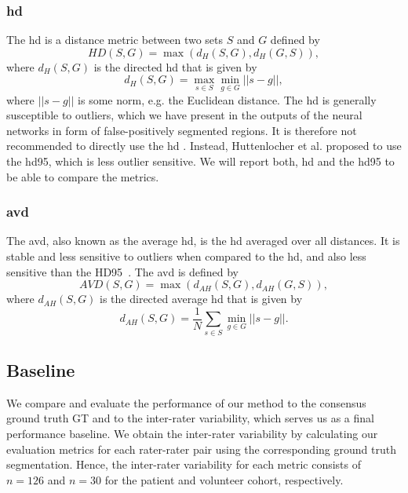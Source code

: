 \subsubsection{\glsdesc{hd}}
The \gls{hd} is a distance metric between two sets $S$ and $G$ defined by
\begin{equation}
   HD(S, G) = \max(d_{H}(S,G),d_{H}(G,S)),
   \label{eq:hd}
\end{equation}
where $d_{H}(S,G)$ is the directed \gls{hd} that is given by
\begin{equation}
   d_{H}(S, G) = \max\limits_{s \in S} \min\limits_{g \in G} ||s-g||,
   \label{eq:dhd}
\end{equation}
where $||s-g||$ is some norm, e.g. the Euclidean distance. The \acrlong{hd} is generally susceptible to outliers, which we have present in the outputs of the neural networks in form of false-positively segmented regions. It is therefore not recommended to directly use the \acrlong{hd} \cite{Taha2015MetricsTool}. Instead, Huttenlocher et al. \cite{Huttenlocher1993ComparingDistance} proposed to use the \gls{hd95}, which is less outlier sensitive. We will report both, \acrlong{hd} and the \acrlong{hd95} to be able to compare the metrics.

\subsubsection{\glsdesc{avd}}
The \gls{avd}, also known as the average \acrlong{hd}, is the \acrlong{hd} averaged over all distances. It is stable and less sensitive to outliers when compared to the \acrlong{hd}, and also less sensitive than the HD95~\cite{Taha2015MetricsTool}. The \acrlong{avd} is defined by
\begin{equation}
   AVD(S, G) = \max(d_{AH}(S,G),d_{AH}(G,S)),
   \label{eq:avd}
\end{equation}
where $d_{AH}(S,G)$ is the directed average \acrlong{hd} that is given by
\begin{equation}
   d_{AH}(S, G) = \frac{1}{N} \sum\limits_{s \in S} \min\limits_{g \in G} ||s-g||.
   \label{eq:dahd}
\end{equation}

\subsection{Baseline} \label{sec:eval_baseline}
We compare and evaluate the performance of our method to the consensus ground truth GT and to the inter-rater variability, which serves us as a final performance baseline. We obtain the inter-rater variability by calculating our evaluation metrics for each rater-rater pair using the corresponding ground truth segmentation. Hence, the inter-rater variability for each metric consists of $n = 126$ and $n = 30$ for the patient and volunteer cohort, respectively.

